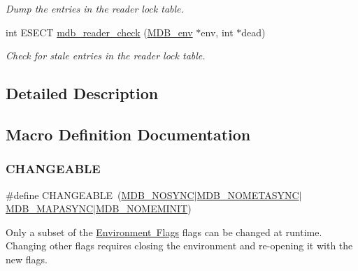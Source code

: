 \begin{DoxyCompactItemize}
\begin{DoxyCompactList}\small\item\em Dump the entries in the reader lock table. \end{DoxyCompactList}\item 
int E\+S\+E\+CT \mbox{\hyperlink{group__internal_ga576f9ec8e49724e52b2cd7ce7b832856}{mdb\+\_\+reader\+\_\+check}} (\mbox{\hyperlink{struct_m_d_b__env}{M\+D\+B\+\_\+env}} $\ast$env, int $\ast$dead)
\begin{DoxyCompactList}\small\item\em Check for stale entries in the reader lock table. \end{DoxyCompactList}\end{DoxyCompactItemize}


\subsection{Detailed Description}


\subsection{Macro Definition Documentation}
\mbox{\label{group__internal_ga73e66d763b8c4837cce5369052628bbe}} 
\subsubsection{\texorpdfstring{C\+H\+A\+N\+G\+E\+A\+B\+LE}{CHANGEABLE}}
{\footnotesize\ttfamily \#define C\+H\+A\+N\+G\+E\+A\+B\+LE~(\mbox{\hyperlink{group__mdb__env_ga5791dd1adb09123f82dd1f331209e12e}{M\+D\+B\+\_\+\+N\+O\+S\+Y\+NC}}$\vert$\mbox{\hyperlink{group__mdb__env_ga5021c4e96ffe9f383f5b8ab2af8e4b16}{M\+D\+B\+\_\+\+N\+O\+M\+E\+T\+A\+S\+Y\+NC}}$\vert$\mbox{\hyperlink{group__mdb__env_gab034ed0d8e5938090aef5ee0997f7e94}{M\+D\+B\+\_\+\+M\+A\+P\+A\+S\+Y\+NC}}$\vert$\mbox{\hyperlink{group__mdb__env_gafa035a1f17ebf31376eafb7bd2cdd448}{M\+D\+B\+\_\+\+N\+O\+M\+E\+M\+I\+N\+IT}})}

Only a subset of the \mbox{\hyperlink{group__mdb__env}{Environment Flags}} flags can be changed at runtime. Changing other flags requires closing the environment and re-\/opening it with the new flags. 

